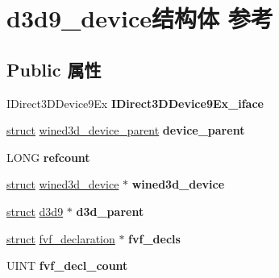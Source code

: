 \hypertarget{structd3d9__device}{}\section{d3d9\+\_\+device结构体 参考}
\label{structd3d9__device}
\subsection*{Public 属性}
\begin{DoxyCompactItemize}
\item 
\mbox{\label{structd3d9__device_a75a2304f52ab67ef568e7c2b4e95185c}} 
I\+Direct3\+D\+Device9\+Ex {\bfseries I\+Direct3\+D\+Device9\+Ex\+\_\+iface}
\item 
\mbox{\label{structd3d9__device_ab34c697eee2f21eb6ec19f1bcbbd2333}} 
\hyperlink{interfacestruct}{struct} \hyperlink{structwined3d__device__parent}{wined3d\+\_\+device\+\_\+parent} {\bfseries device\+\_\+parent}
\item 
\mbox{\label{structd3d9__device_a0885eb44a9be23e766804cc008f5ac07}} 
L\+O\+NG {\bfseries refcount}
\item 
\mbox{\label{structd3d9__device_abde5929a20026e1066259ab3787b82a8}} 
\hyperlink{interfacestruct}{struct} \hyperlink{structwined3d__device}{wined3d\+\_\+device} $\ast$ {\bfseries wined3d\+\_\+device}
\item 
\mbox{\label{structd3d9__device_a297b252df1afcecef999b2dc62a17f65}} 
\hyperlink{interfacestruct}{struct} \hyperlink{structd3d9}{d3d9} $\ast$ {\bfseries d3d\+\_\+parent}
\item 
\mbox{\label{structd3d9__device_a31b83016371aa083d0403f7e8ae3a5b9}} 
\hyperlink{interfacestruct}{struct} \hyperlink{structfvf__declaration}{fvf\+\_\+declaration} $\ast$ {\bfseries fvf\+\_\+decls}
\item 
\mbox{\label{structd3d9__device_a6efdfcc3e5819b1bd58f962a9d09a9a8}} 
U\+I\+NT {\bfseries fvf\+\_\+decl\+\_\+count}
\item 
\mbox{\label{structd3d9__device_a7cc77c274e3ac0c1b036e8d6e2af57f1}} 

\end{DoxyCompactItemize}
